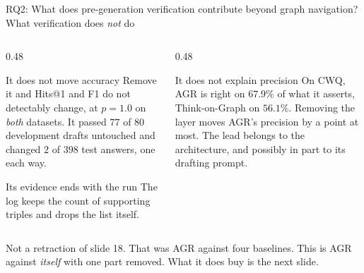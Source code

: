{%
\begin{frame}{RQ2: What does pre-generation verification contribute beyond graph navigation?}{What verification does \emph{not} do}
  \begin{columns}[T]
    \begin{column}{0.48\textwidth}
      \begin{block}{It does not move accuracy}
        \small\agrraggedright
        Remove it and Hits@1 and F1 do not detectably change, at
        $p = 1.0$ on \emph{both} datasets. It passed $77$ of $80$
        development drafts untouched and changed $2$ of $398$ test answers,
        one each way.
      \end{block}
      \vspace{1mm}
      \begin{block}{Its evidence ends with the run}
        \small\agrraggedright
        The log keeps the \alert{count} of supporting triples and drops the
        list itself.
      \end{block}
    \end{column}
    \begin{column}{0.48\textwidth}
      \begin{block}{It does not explain precision}
        \small\agrraggedright
        On CWQ, AGR is right on $67.9\%$ of what it asserts, Think-on-Graph
        on $56.1\%$. Removing the layer moves AGR's precision by a point at
        most. The lead belongs to the architecture, and possibly in part to
        its drafting prompt.
      \end{block}
    \end{column}
  \end{columns}
  \vspace{2mm}\sinkfoot
  {\small Not a retraction of slide 18. That was AGR against four
  baselines. This is AGR against \emph{itself} with one part removed.
  \alert{What it does buy is the next slide.}\par}
\end{frame}

}
